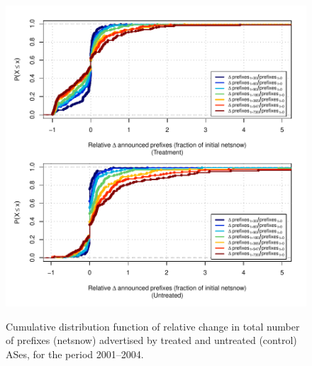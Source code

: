\begin{figure}[H]
\begin{centering}
\begin{singlespace}
    \includegraphics[width=6in]{figures/behavior-rel_netsnow-2001_2004-corr.pdf}
    \vspace{-2em}\\
    \caption{Cumulative distribution function of relative change in total number of prefixes (netsnow) advertised by treated and untreated (control) ASes, for the period 2001--2004.}
\end{singlespace}
\end{centering}
\end{figure}
